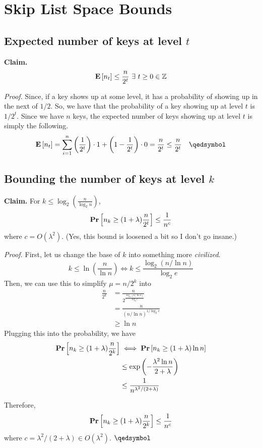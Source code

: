 \chapter{Skip List Space Bounds}

\section{Expected number of keys at level $t$}

\textbf{Claim.} \[ \mathbf{E}\left[n_t\right] \leq \frac{n}{2^t}\ \exists\ t\geq 0\in\mathbb Z \]

\textit{Proof.} Since, if a key shows up at some level, it has a probability of showing up in the next of $1/2$. So, we have that the probability of a key showing up at level $t$ is $1/2^t$. Since we have $n$ keys, the expected number of keys showing up at level $t$ is simply the following.
\[ \ex{n_t} = \sum_{i=1}^n \left(\frac{1}{2^t}\right)\cdot 1 + \left(1 - \frac{1}{2^t}\right)\cdot 0 = \frac{n}{2^t} \leq \frac{n}{2^t}\quad \qedsymbol \]

\section{Bounding the number of keys at level $k$}

\textbf{Claim.} For $k \leq \log_2\left(\frac{n}{\log_2 n}\right)$, 
\[ \mathbf{Pr}\left[n_k \geq (1 + \lambda)\frac{n}{2^t}\right] \leq \frac{1}{n^c} \]
where $c = O(\lambda^2)$. (Yes, this bound is loosened a bit so I don't go insane.)

\textit{Proof.} First, let us change the base of $k$ into something more \textit{civilized}.
\[ k \leq \ln\left(\frac{n}{\ln n}\right) \iff k \leq \frac{\log_2(n/\ln n)}{\log_2 e} \]
Then, we can use this to simplify $\mu = n/2^k$ into
\begin{equation*}
\begin{aligned}
	\frac{n}{2^k} &= \frac{n}{2^{\frac{\log_2(n/\ln n)}{\log_2 e}}} \\
				  &= \frac{n}{(n/\ln n)^{1/\log_2 e}} \\
				  &\geq \ln n
\end{aligned}
\end{equation*}
Plugging this into the probability, we have 
\begin{equation*}
\begin{aligned}
	\mathbf{Pr}\left[n_k \geq (1 + \lambda)\frac{n}{2^k}\right] &\iff \mathbf{Pr}\left[n_k \geq (1 + \lambda) \ln n\right] \\
											 &\leq \exp\left(- \frac{\lambda^2 \ln n}{2 + \lambda}\right) \\
											 &\leq \frac{1}{n^{\lambda^2 / (2 + \lambda)}}
\end{aligned}
\end{equation*}

Therefore, \[ \mathbf{Pr}\left[n_k \geq (1 + \lambda)\frac{n}{2^k}\right] \leq \frac{1}{n^{c}} \] where $c = \lambda^2 / (2 + \lambda) \in O(\lambda^2)$. $\qedsymbol$
